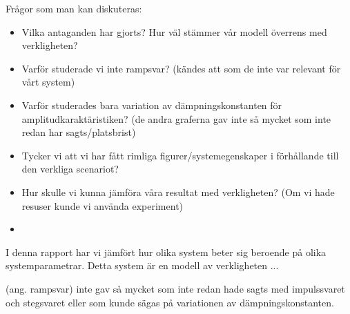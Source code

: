 
Frågor som man kan diskuteras:
\begin{itemize}
    \item Vilka antaganden har gjorts? Hur väl stämmer vår modell överrens med verkligheten?
    \item Varför studerade vi inte rampsvar? (kändes att som de inte var relevant för vårt system)
    \item Varför studerades bara variation av dämpningskonstanten för amplitudkaraktäristiken? (de andra graferna gav inte så mycket som inte redan har sagts/platsbrist)
    \item Tycker vi att vi har fått rimliga figurer/systemegenskaper i förhållande till den verkliga scenariot?
    \item Hur skulle vi kunna jämföra våra resultat med verkligheten?
    (Om vi hade resuser kunde vi använda experiment)
    \item 
\end{itemize}


I denna rapport har vi jämfört hur olika system beter sig beroende på olika systemparametrar. Detta system är en modell av verkligheten ...

(ang. rampsvar)
inte gav så mycket som inte redan hade sagts med impulssvaret och stegsvaret eller som kunde sägas på variationen av dämpningskonstanten. 